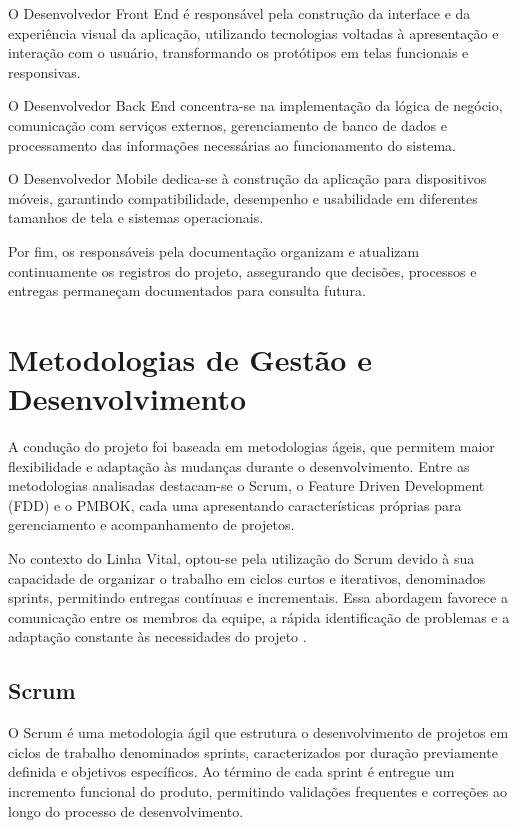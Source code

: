 O Desenvolvedor Front End é responsável pela construção da interface e da experiência visual da aplicação, utilizando tecnologias voltadas à apresentação e interação com o usuário, transformando os protótipos em telas funcionais e responsivas.

O Desenvolvedor Back End concentra-se na implementação da lógica de negócio, comunicação com serviços externos, gerenciamento de banco de dados e processamento das informações necessárias ao funcionamento do sistema.

O Desenvolvedor Mobile dedica-se à construção da aplicação para dispositivos móveis, garantindo compatibilidade, desempenho e usabilidade em diferentes tamanhos de tela e sistemas operacionais.

Por fim, os responsáveis pela documentação organizam e atualizam continuamente os registros do projeto, assegurando que decisões, processos e entregas permaneçam documentados para consulta futura.

\section{Metodologias de Gestão e Desenvolvimento}

A condução do projeto foi baseada em metodologias ágeis, que permitem maior flexibilidade e adaptação às mudanças durante o desenvolvimento. Entre as metodologias analisadas destacam-se o Scrum, o Feature Driven Development (FDD) e o PMBOK, cada uma apresentando características próprias para gerenciamento e acompanhamento de projetos.

No contexto do Linha Vital, optou-se pela utilização do Scrum devido à sua capacidade de organizar o trabalho em ciclos curtos e iterativos, denominados sprints, permitindo entregas contínuas e incrementais. Essa abordagem favorece a comunicação entre os membros da equipe, a rápida identificação de problemas e a adaptação constante às necessidades do projeto \cite{scrumguide2020}.

\subsection{Scrum}

O Scrum é uma metodologia ágil que estrutura o desenvolvimento de projetos em ciclos de trabalho denominados sprints, caracterizados por duração previamente definida e objetivos específicos. Ao término de cada sprint é entregue um incremento funcional do produto, permitindo validações frequentes e correções ao longo do processo de desenvolvimento.

